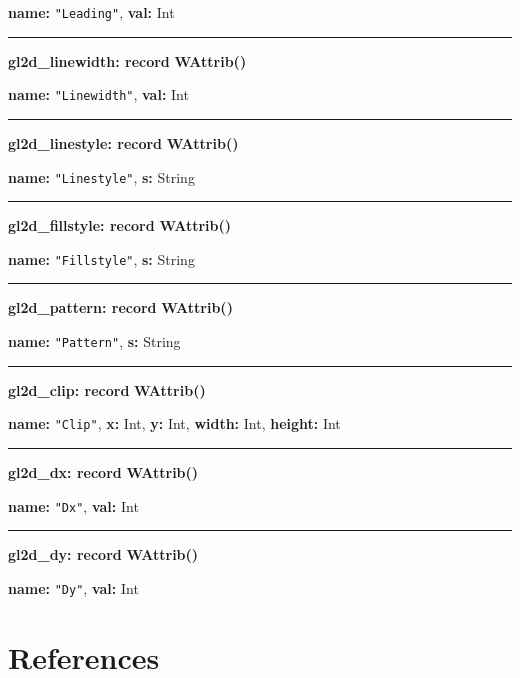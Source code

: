 \documentclass[letterpaper,12pt]{article}
\begin{document}
{\bf name:} \texttt{"Leading"},\newline\indent
{\bf val:} Int 

\bigskip\hrule\vspace{0.1cm}
\noindent
{\bf gl2d\_linewidth: record} \hfill {\bf WAttrib()}

{\bf name:} \texttt{"Linewidth"},\newline\indent
{\bf val:} Int 

\bigskip\hrule\vspace{0.1cm}
\noindent
{\bf gl2d\_linestyle: record} \hfill {\bf WAttrib()}

{\bf name:} \texttt{"Linestyle"},\newline\indent
{\bf s:} String 

\bigskip\hrule\vspace{0.1cm}
\noindent
{\bf gl2d\_fillstyle: record} \hfill {\bf WAttrib()}

{\bf name:} \texttt{"Fillstyle"},\newline\indent
{\bf s:} String 

\bigskip\hrule\vspace{0.1cm}
\noindent
{\bf gl2d\_pattern: record} \hfill {\bf WAttrib()}

{\bf name:} \texttt{"Pattern"},\newline\indent
{\bf s:} String

\bigskip\hrule\vspace{0.1cm}
\noindent
{\bf gl2d\_clip: record} \hfill {\bf WAttrib()}

{\bf name:} \texttt{"Clip"},\newline\indent
{\bf x:} Int,
{\bf y:} Int,
{\bf width:} Int,
{\bf height:} Int 

\bigskip\hrule\vspace{0.1cm}
\noindent
{\bf gl2d\_dx: record} \hfill {\bf WAttrib()}

{\bf name:} \texttt{"Dx"},\newline\indent
{\bf val:} Int

\bigskip\hrule\vspace{0.1cm}
\noindent
{\bf gl2d\_dy: record} \hfill {\bf WAttrib()}

{\bf name:} \texttt{"Dy"},\newline\indent
{\bf val:} Int

\newpage
\section{References}
\end{document}
